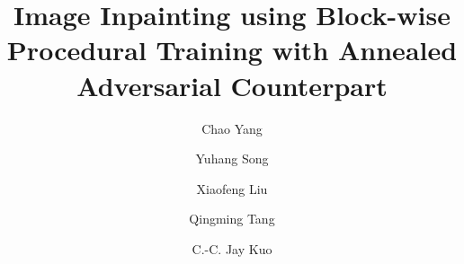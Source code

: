 \documentclass[10pt,twocolumn,letterpaper]{article}
\newcommand\blfootnote[1]{%
  \begingroup
  \renewcommand\thefootnote{}\footnote{#1}%
  \addtocounter{footnote}{-1}%
  \endgroup
}
\begin{document}
\def\ECCV18SubNumber{1283}  %

\title{Image Inpainting using Block-wise Procedural Training with Annealed Adversarial Counterpart} %


\author[1]{Chao Yang}
\author[1]{Yuhang Song}
\author[2]{Xiaofeng Liu}
\author[3]{Qingming Tang}
\author[1]{C.-C. Jay Kuo}

\maketitle





%










\end{document}
